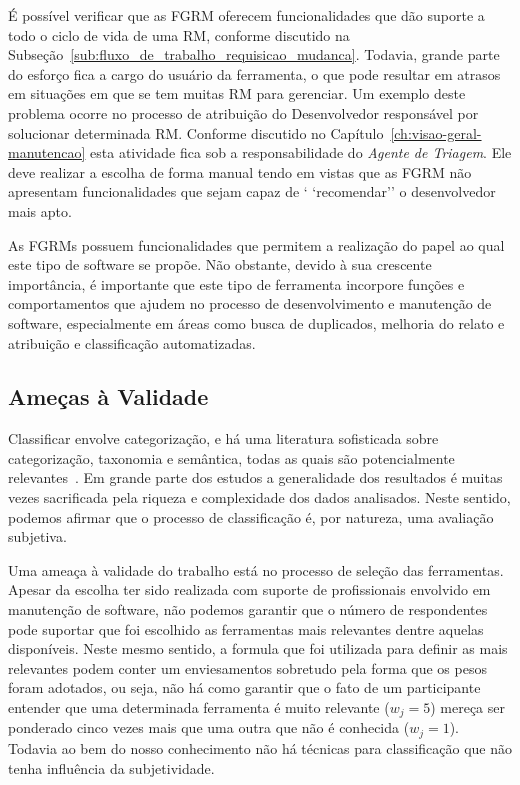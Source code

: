É possível verificar que as FGRM oferecem funcionalidades que dão suporte a todo
o ciclo de vida de uma RM, conforme discutido na
Subseção~\ref{sub:fluxo_de_trabalho_requisicao_mudanca}. Todavia, grande parte
do esforço fica a cargo do usuário da ferramenta, o que pode resultar em atrasos
em situações em que se tem muitas RM para gerenciar. Um exemplo deste problema
ocorre no processo de atribuição do Desenvolvedor responsável por solucionar
determinada RM\@. Conforme discutido no Capítulo~\ref{ch:visao-geral-manutencao}
esta atividade fica sob a responsabilidade do \textit{Agente de Triagem}. Ele
deve realizar a escolha de forma manual tendo em vistas que as FGRM não
apresentam funcionalidades que sejam capaz de ` `recomendar'' o desenvolvedor
mais apto.

As FGRMs possuem funcionalidades que permitem a realização do papel ao qual
este tipo de software se propõe. Não obstante, devido à sua crescente
importância, é importante que este tipo de ferramenta incorpore funções e
comportamentos que ajudem no processo de desenvolvimento e manutenção de
software, especialmente em áreas como busca de duplicados, melhoria do relato e
atribuição e classificação automatizadas.

\subsection{Ameças à Validade}
\label{sec:ameacas_a_validade}

Classificar envolve categorização, e há uma literatura sofisticada sobre
categorização, taxonomia e semântica, todas as quais são potencialmente
relevantes~\cite{rugg2005sorting}. Em grande parte dos estudos a generalidade
dos resultados é muitas vezes sacrificada pela riqueza e complexidade dos dados
analisados. Neste sentido, podemos afirmar que o processo de classificação é,
por natureza, uma avaliação subjetiva.

Uma ameaça à validade do trabalho está no processo de seleção das ferramentas.
Apesar da escolha ter sido realizada com suporte de profissionais envolvido em
manutenção de software, não podemos garantir que o número de respondentes pode
suportar que foi escolhido as ferramentas mais relevantes dentre aquelas
disponíveis. Neste mesmo sentido, a formula que foi utilizada para definir as
mais relevantes podem conter um enviesamentos sobretudo pela forma que os pesos
foram adotados, ou seja, não há como garantir que o fato de um participante
entender que uma determinada ferramenta é muito relevante ($w_j = 5$) mereça ser
ponderado cinco vezes mais que uma outra que não é conhecida ($w_j = 1$).
Todavia ao bem do nosso conhecimento não há técnicas para classificação que não
tenha influência da subjetividade.

